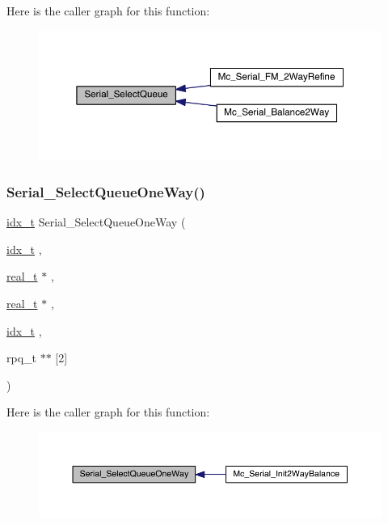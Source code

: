 Here is the caller graph for this function\+:\nopagebreak
\begin{figure}[H]
\begin{center}
\leavevmode
\includegraphics[width=350pt]{a00951_a181213dcf1cf06a0cc6bf45b89ab881a_icgraph}
\end{center}
\end{figure}
\mbox{\label{a00951_aacd41e253622410ce03e435ce404435a}} 
\subsubsection{\texorpdfstring{Serial\+\_\+\+Select\+Queue\+One\+Way()}{Serial\_SelectQueueOneWay()}}
{\footnotesize\ttfamily \hyperlink{a00876_aaa5262be3e700770163401acb0150f52}{idx\+\_\+t} Serial\+\_\+\+Select\+Queue\+One\+Way (\begin{DoxyParamCaption}\item[{\hyperlink{a00876_aaa5262be3e700770163401acb0150f52}{idx\+\_\+t}}]{,  }\item[{\hyperlink{a00876_a1924a4f6907cc3833213aba1f07fcbe9}{real\+\_\+t} $\ast$}]{,  }\item[{\hyperlink{a00876_a1924a4f6907cc3833213aba1f07fcbe9}{real\+\_\+t} $\ast$}]{,  }\item[{\hyperlink{a00876_aaa5262be3e700770163401acb0150f52}{idx\+\_\+t}}]{,  }\item[{rpq\+\_\+t $\ast$$\ast$}]{\mbox{[}2\mbox{]} }\end{DoxyParamCaption})}

Here is the caller graph for this function\+:\nopagebreak
\begin{figure}[H]
\begin{center}
\leavevmode
\includegraphics[width=350pt]{a00951_aacd41e253622410ce03e435ce404435a_icgraph}
\end{center}
\end{figure}
\mbox{\label{a00951_a0a618b7fb342f6de87bfbd31dd0c4580}} 
